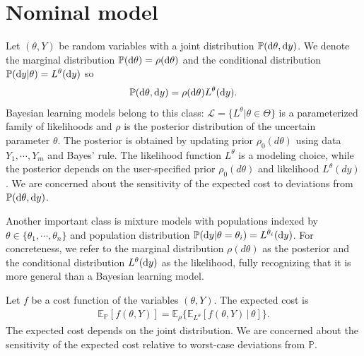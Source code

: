 \documentclass[11pt,reqno,letter]{amsart}
\theoremstyle{plain}
\theoremstyle{definition}
\numberwithin{equation}{section}
\numberwithin{theorem}{section}
\numberwithin{table}{section}
\numberwithin{figure}{section}
\begin{document}
\section{Nominal model}
\label{sec:nominal}

Let $(\theta, Y)$ be random variables with a joint distribution ${\mathbb P}({\rm d}\theta, {\rm d}y)$. We denote the marginal distribution ${\mathbb P}({\rm d}\theta) = \rho({\rm d}\theta)$ 
and the conditional distribution  ${\mathbb P}({\rm d}y|\theta) = L^\theta({\rm d}y)$ so
\begin{eqnarray*}
{\mathbb P}({\rm d}\theta, {\rm d}y) = \rho({\rm d}\theta)L^\theta({\rm d}y).
\end{eqnarray*}
Bayesian learning models belong to this class: ${\mathcal L} = \{L^{\theta}\vert \theta\in\Theta\}$ is a parameterized family of likelihoods and $\rho$ is the posterior distribution of the uncertain parameter $\theta$.
The posterior is obtained by updating prior $\rho_0(d\theta)$ using data $Y_1, \cdots, Y_m$ and Bayes' rule. The likelihood function $L^\theta$ is a modeling choice, while the posterior depends on the user-specified prior $\rho_0(d\theta)$ and likelihood $L^{\theta}(dy)$. We are concerned about the sensitivity of the expected cost to deviations from ${\mathbb P}({\rm d}\theta, {\rm d}y)$.  

Another important class is mixture models with populations indexed by $\theta\in\{\theta_1, \cdots, \theta_n\}$ and population distribution ${\mathbb P}({\rm d}y|\theta=\theta_i) = L^{\theta_i}({\rm d}y)$. 
For concreteness, we refer to the marginal distribution $\rho(d\theta)$ as the posterior and the conditional distribution $L^\theta({\rm d}y)$ as the likelihood, fully recognizing that it is more general than a Bayesian learning model. 

Let $f$ be a cost function of the variables $(\theta, Y)$. %
The expected cost is
\begin{eqnarray*}
{\mathbb E}_{\mathbb P}[f(\theta, Y)] = {\mathbb E}_\rho\big\{{\mathbb E}_{L^\theta}[f(\theta, Y)\, | \, \theta]\big\}.
\end{eqnarray*}
The expected cost depends on the joint distribution. We are concerned about the sensitivity of the expected cost relative to worst-case deviations from $\mathbb P$. 
\end{document}
